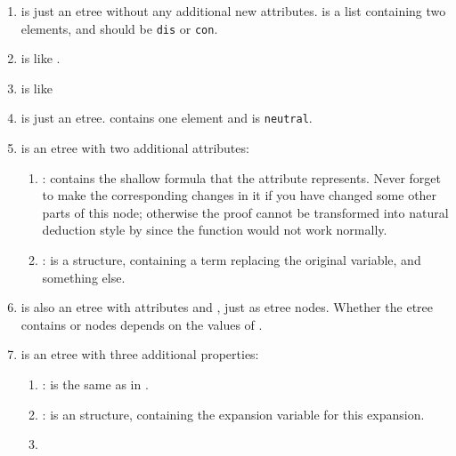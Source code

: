 \begin{enumerate}
\item {} is just an etree without 
any additional new attributes.  is a list containing two 
elements, and  should be {\tt dis} or {\tt con}.

\item {} is like .

\item {} is like 

\item {} is just an etree.  contains one element
and  is {\tt neutral}.

\item {} is an etree with two additional attributes:
\begin{enumerate}
\item {}: contains the shallow formula that the attribute 
 represents.
Never forget to make the corresponding changes in it if you have changed some 
other parts of this node; otherwise the proof cannot be transformed into natural 
deduction style by 
since the function  would not work normally.

\item {}: is a  structure, containing
a term replacing the original variable, and something else.
\end{enumerate}

\item {} is also an etree with attributes 
and , just as  etree nodes.  Whether the
etree contains  or  nodes depends on
the values of .

\item {} is an etree with three additional properties:
\begin{enumerate}
\item {}: is the same as in .
\item {}: is an  structure, containing the 
expansion variable for this expansion.
\item {}
\end{enumerate}


\end{enumerate}
